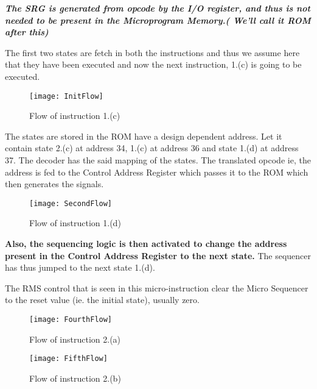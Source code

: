 \textbf{\textit{The SRG is generated from opcode by the I/O register, and thus is not needed to be present in the Microprogram Memory.( We'll call it ROM after this)}}

The first two states are fetch in both the instructions and thus we assume here that they have been executed and now the next instruction, 1.(c) is going to be executed.

\begin{figure}[h]
    \begin{center}
        \texttt{[image: InitFlow]}
    \end{center}
    \caption{Flow of instruction 1.(c)}
\end{figure}

The states are stored in the ROM have a design dependent address. Let it contain state 2.(c) at address 34, 1.(c) at address 36 and state 1.(d) at address 37. The decoder has the said mapping of the states. The translated opcode ie, the address is fed to the Control Address Register which passes it to the ROM which then generates the signals. 

\begin{figure}[h]
    \begin{center}
        \texttt{[image: SecondFlow]}
    \end{center}
    \caption{Flow of instruction 1.(d)}
\end{figure}

\textbf{Also, the sequencing logic is then activated to change the address present in the Control Address Register to the next state.} The sequencer has thus jumped to the next state 1.(d).

The RMS control that is seen in this micro-instruction clear the Micro Sequencer to the reset value (ie. the initial state), usually zero.

\begin{figure}[h]
    \begin{center}
        \texttt{[image: FourthFlow]}
    \end{center}
    \caption{Flow of instruction 2.(a)}
\end{figure}


\begin{figure}[h]
    \begin{center}
        \texttt{[image: FifthFlow]}
    \end{center}
    \caption{Flow of instruction 2.(b)}
\end{figure}

